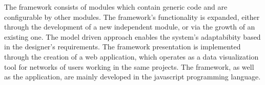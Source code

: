 	The framework consists of modules which contain generic code and are configurable by other modules. The framework's functionality is expanded, either through the development of a new independent module, or via the growth of an existing one. The model driven approach enables the system's adaptabibity based in the designer's requirements. The framework presentation is implemented through the creation of a web application, which operates as a data visualization tool for networks of users working in the same projects. The framework, as well as the application, are mainly developed in the javascript programming language.


%
